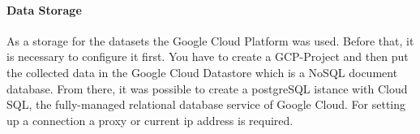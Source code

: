 \paragraph{Data Storage}
\label{par:storage}
As a storage for the datasets the Google Cloud Platform was used. Before that, it is necessary to configure it first. You have to create a GCP-Project and then put the collected data in the Google Cloud Datastore which is a NoSQL document database. From there, it was possible to create a postgreSQL istance with Cloud SQL, the fully-managed relational database service of Google Cloud. For setting up a connection a proxy or current ip address is required.
